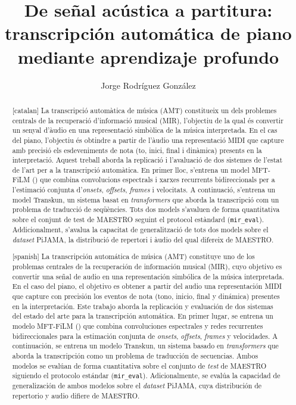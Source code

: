 \documentclass[11pt,spanish,listoffigures,listoftables]{tfgetsinf}
\title{De señal acústica a partitura: transcripción automática de piano mediante aprendizaje profundo}
\author{Jorge Rodríguez González}
\begin{document}

\begin{abstract}[catalan]
La transcripció automàtica de música (AMT) constitueix un dels problemes centrals de la recuperació d'informació musical (MIR), l'objectiu de la qual és convertir un senyal d'àudio en una representació simbòlica de la música interpretada.
En el cas del piano, l'objectiu és obtindre a partir de l'àudio una representació MIDI que capture amb precisió els esdeveniments de nota (to, inici, final i dinàmica) presents en la interpretació. Aquest treball aborda la replicació i l'avaluació de dos sistemes de l'estat de l'art per a la transcripció automàtica.
En primer lloc, s'entrena un model MFT-FiLM () que combina convolucions espectrals i xarxes recurrents bidireccionals per a l'estimació conjunta d'\textit{onsets}, \textit{offsets}, \textit{frames} i velocitats. A continuació, s'entrena un model Transkun, un sistema basat en \textit{transformers} que aborda la transcripció com un problema de traducció de seqüències. Tots dos models s'avaluen de forma quantitativa sobre el conjunt de test de MAESTRO seguint el protocol estàndard (\texorpdfstring{\texttt{mir\_eval}}{mir_eval}).
Addicionalment, s'avalua la capacitat de generalització de tots dos models sobre el \textit{dataset} PiJAMA, la distribució de repertori i àudio del qual difereix de MAESTRO.
\end{abstract}
\begin{abstract}[spanish]
La transcripción automática de música (AMT) constituye uno de los problemas centrales de la recuperación de información musical (MIR), cuyo objetivo es convertir una señal de audio en una representación simbólica de la música interpretada.
En el caso del piano, el objetivo es obtener a partir del audio una representación MIDI que capture con precisión los eventos de nota (tono, inicio, final y dinámica) presentes en la interpretación. Este trabajo aborda la replicación y evaluación de dos sistemas del estado del arte para la transcripción automática.
En primer lugar, se entrena un modelo MFT-FiLM () que combina convoluciones espectrales y redes recurrentes bidireccionales para la estimación conjunta de \textit{onsets}, \textit{offsets}, \textit{frames} y velocidades. A continuación, se entrena un modelo Transkun, un sistema basado en \textit{transformers} que aborda la transcripción como un problema de traducción de secuencias. Ambos modelos se evalúan de forma cuantitativa sobre el conjunto de \textit{test} de MAESTRO siguiendo el protocolo estándar (\texorpdfstring{\texttt{mir\_eval}}{mir_eval}).
Adicionalmente, se evalúa la capacidad de generalización de ambos modelos sobre el \textit{dataset} PiJAMA, cuya distribución de repertorio y audio difiere de MAESTRO.
\end{abstract}
\end{document}
